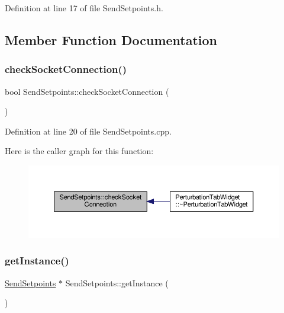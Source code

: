 Definition at line 17 of file Send\+Setpoints.\+h.



\subsection{Member Function Documentation}
\mbox{\label{class_send_setpoints_a6adbd2459fda6c6e5fad428656ad68a4}} 
\subsubsection{\texorpdfstring{check\+Socket\+Connection()}{checkSocketConnection()}}
{\footnotesize\ttfamily bool Send\+Setpoints\+::check\+Socket\+Connection (\begin{DoxyParamCaption}{ }\end{DoxyParamCaption})}



Definition at line 20 of file Send\+Setpoints.\+cpp.

Here is the caller graph for this function\+:
\nopagebreak
\begin{figure}[H]
\begin{center}
\leavevmode
\includegraphics[width=350pt]{class_send_setpoints_a6adbd2459fda6c6e5fad428656ad68a4_icgraph}
\end{center}
\end{figure}
\mbox{\label{class_send_setpoints_ac69cc30ed614e18793b22ac9b63100fd}} 
\subsubsection{\texorpdfstring{get\+Instance()}{getInstance()}}
{\footnotesize\ttfamily \hyperlink{class_send_setpoints}{Send\+Setpoints} $\ast$ Send\+Setpoints\+::get\+Instance (\begin{DoxyParamCaption}{ }\end{DoxyParamCaption})\hspace{0.3cm}{\ttfamily [static]}}



